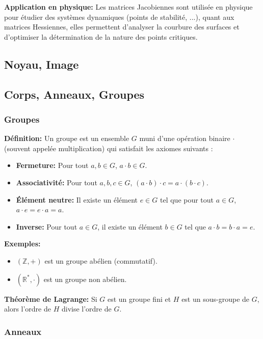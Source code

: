 \textbf{Application en physique:}
Les matrices Jacobiennes sont utilisée en physique pour étudier des systèmes dynamiques (points de stabilité, ...), quant aux matrices Hessiennes, elles permettent d'analyser la courbure des surfaces et d'optimiser la détermination de la nature des points critiques. 


\subsection{Noyau, Image}
\subsection{Corps, Anneaux, Groupes}

\subsubsection{Groupes}

\textbf{Définition:}
Un groupe est un ensemble $G$ muni d'une opération binaire $\cdot$ (souvent appelée multiplication) qui satisfait les axiomes suivants :
\begin{itemize}
    \item \textbf{Fermeture:} Pour tout $a, b \in G$, $a \cdot b \in G$.
    \item \textbf{Associativité:} Pour tout $a, b, c \in G$, $(a \cdot b) \cdot c = a \cdot (b \cdot c)$.
    \item \textbf{Élément neutre:} Il existe un élément $e \in G$ tel que pour tout $a \in G$, $a \cdot e = e \cdot a = a$.
    \item \textbf{Inverse:} Pour tout $a \in G$, il existe un élément $b \in G$ tel que $a \cdot b = b \cdot a = e$.
\end{itemize}

\textbf{Exemples:}
\begin{itemize}
    \item $(\mathbb{Z}, +)$ est un groupe abélien (commutatif).
    \item $(\mathbb{R}^*, \cdot)$ est un groupe non abélien.
\end{itemize}

\textbf{Théorème de Lagrange:}
Si $G$ est un groupe fini et $H$ est un sous-groupe de $G$, alors l'ordre de $H$ divise l'ordre de $G$.

\subsubsection{Anneaux}

